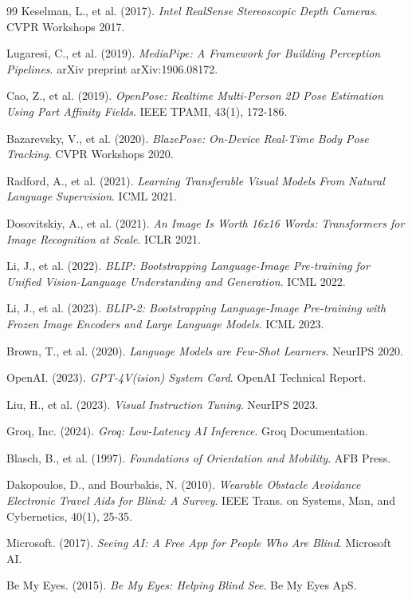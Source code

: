 \documentclass[12pt,a4paper]{report}
\begin{document}
\begin{thebibliography}{99}
Keselman, L., et al. (2017). \textit{Intel RealSense Stereoscopic Depth Cameras}. CVPR Workshops 2017.

Lugaresi, C., et al. (2019). \textit{MediaPipe: A Framework for Building Perception Pipelines}. arXiv preprint arXiv:1906.08172.

Cao, Z., et al. (2019). \textit{OpenPose: Realtime Multi-Person 2D Pose Estimation Using Part Affinity Fields}. IEEE TPAMI, 43(1), 172-186.

Bazarevsky, V., et al. (2020). \textit{BlazePose: On-Device Real-Time Body Pose Tracking}. CVPR Workshops 2020.

Radford, A., et al. (2021). \textit{Learning Transferable Visual Models From Natural Language Supervision}. ICML 2021.

Dosovitskiy, A., et al. (2021). \textit{An Image Is Worth 16x16 Words: Transformers for Image Recognition at Scale}. ICLR 2021.

Li, J., et al. (2022). \textit{BLIP: Bootstrapping Language-Image Pre-training for Unified Vision-Language Understanding and Generation}. ICML 2022.

Li, J., et al. (2023). \textit{BLIP-2: Bootstrapping Language-Image Pre-training with Frozen Image Encoders and Large Language Models}. ICML 2023.

Brown, T., et al. (2020). \textit{Language Models are Few-Shot Learners}. NeurIPS 2020.

OpenAI. (2023). \textit{GPT-4V(ision) System Card}. OpenAI Technical Report.

Liu, H., et al. (2023). \textit{Visual Instruction Tuning}. NeurIPS 2023.

Groq, Inc. (2024). \textit{Groq: Low-Latency AI Inference}. Groq Documentation.

Blasch, B., et al. (1997). \textit{Foundations of Orientation and Mobility}. AFB Press.

Dakopoulos, D., and Bourbakis, N. (2010). \textit{Wearable Obstacle Avoidance Electronic Travel Aids for Blind: A Survey}. IEEE Trans. on Systems, Man, and Cybernetics, 40(1), 25-35.

Microsoft. (2017). \textit{Seeing AI: A Free App for People Who Are Blind}. Microsoft AI.

Be My Eyes. (2015). \textit{Be My Eyes: Helping Blind See}. Be My Eyes ApS.


\end{thebibliography}
\end{document}
